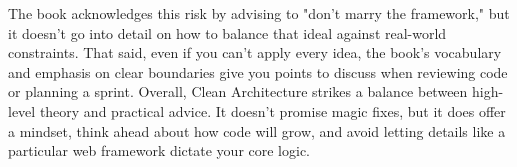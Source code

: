 \documentclass[../Main.tex]{subfiles}
\begin{document}
The book acknowledges this risk by advising to "don't marry the framework," but it doesn't go into detail on how to balance that ideal against real-world constraints.
That said, even if you can't apply every idea, the book's vocabulary and emphasis on clear boundaries give you points to discuss when reviewing code or planning a sprint.
\linebreak
\linebreak
Overall, Clean Architecture strikes a balance between high-level theory and practical advice.
It doesn't promise magic fixes, but it does offer a mindset, think ahead about how code will grow, and avoid letting details like a particular web framework dictate your core logic.
\end{document}
